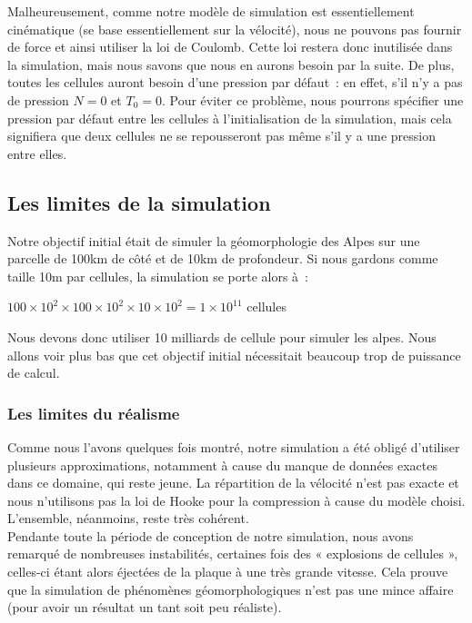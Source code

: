 \documentclass[a4paper,11pt]{article}
\begin{document}
Malheureusement, comme notre modèle de simulation est essentiellement cinématique (se base essentiellement sur la vélocité), nous ne pouvons pas fournir de force et ainsi utiliser la loi de Coulomb.
Cette loi restera donc inutilisée dans la simulation, mais nous savons que nous en aurons besoin par la suite.
De plus, toutes les cellules auront besoin d'une pression par défaut~: en effet, s'il n'y a pas de pression $N = 0$ et $T_0 = 0$.
Pour éviter ce problème, nous pourrons spécifier une pression par défaut entre les cellules à l'initialisation de la simulation, mais cela signifiera que deux cellules ne se repousseront pas même s'il y a une pression entre elles. 

\subsection{Les limites de la simulation}

Notre objectif initial était de simuler la géomorphologie des Alpes sur une parcelle de 100km de côté et de 10km de profondeur.
Si nous gardons comme taille 10m par cellules, la simulation se porte alors à~:
\begin{center}
  $100 \times 10^2 \times 100 \times 10^2 \times 10 \times 10^2 = 1 \times 10^{11}$ cellules
\end{center}
Nous devons donc utiliser 10 milliards de cellule pour simuler les alpes.
Nous allons voir plus bas que cet objectif initial nécessitait beaucoup trop de puissance de calcul.

\subsubsection{Les limites du réalisme}

Comme nous l'avons quelques fois montré, notre simulation a été obligé d'utiliser plusieurs approximations, notamment à cause du manque de données exactes dans ce domaine, qui reste jeune.
La répartition de la vélocité n'est pas exacte et nous n'utilisons pas la loi de Hooke pour la compression à cause du modèle choisi.
L'ensemble, néanmoins, reste très cohérent.\\
Pendante toute la période de conception de notre simulation, nous avons remarqué de nombreuses instabilités, certaines fois des « explosions de cellules », celles-ci étant alors éjectées de la plaque à une très grande vitesse.
Cela prouve que la simulation de phénomènes géomorphologiques n'est pas une mince affaire (pour avoir un résultat un tant soit peu réaliste).
\end{document}
